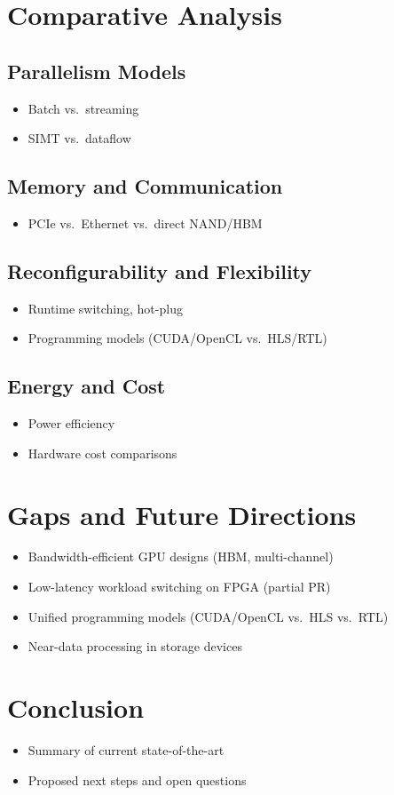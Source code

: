 \documentclass[sigconf]{acmart}
\begin{document}
\section{Comparative Analysis}
  \subsection{Parallelism Models}
    \begin{itemize}
      \item Batch vs.~streaming
      \item SIMT vs.~dataflow
    \end{itemize}
  \subsection{Memory and Communication}
    \begin{itemize}
      \item PCIe vs.~Ethernet vs.~direct NAND/HBM
    \end{itemize}
  \subsection{Reconfigurability and Flexibility}
    \begin{itemize}
      \item Runtime switching, hot-plug
      \item Programming models (CUDA/OpenCL vs.~HLS/RTL)
    \end{itemize}
  \subsection{Energy and Cost}
    \begin{itemize}
      \item Power efficiency
      \item Hardware cost comparisons
    \end{itemize}

\section{Gaps and Future Directions}
  \begin{itemize}
    \item Bandwidth-efficient GPU designs (HBM, multi-channel)
    \item Low-latency workload switching on FPGA (partial PR)
    \item Unified programming models (CUDA/OpenCL vs.~HLS vs.~RTL)
    \item Near-data processing in storage devices
  \end{itemize}

\section{Conclusion}
  \begin{itemize}
    \item Summary of current state-of-the-art
    \item Proposed next steps and open questions
  \end{itemize}


\nocite{*}

\end{document}
